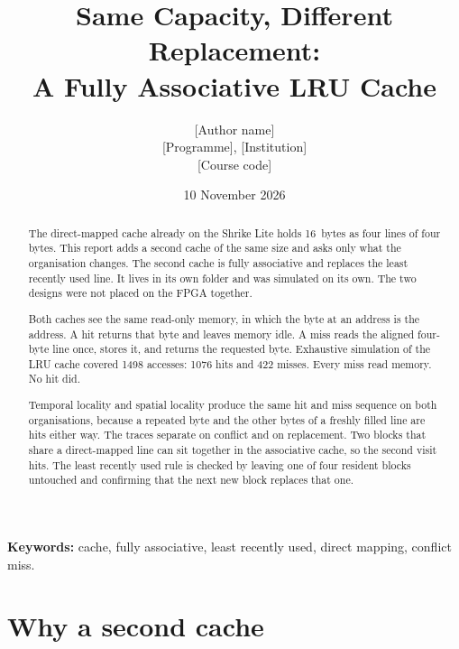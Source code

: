 \documentclass[a4paper,11pt,oneside,headings=small,parskip=half,titlepage=false]{scrreprt}
\begin{document}
\titlehead{Computer architecture project report}
\subject{Fully associative LRU, compared with the direct-mapped cache}
\title{Same Capacity, Different Replacement:\\A Fully Associative LRU Cache}
\author{[Author name]\\[0.35em]
\normalsize [Programme], [Institution]\\
\normalsize [Course code]}
\date{10 November 2026}
\publishers{Simulation of the LRU cache. The direct-mapped cache is the board design.}
\maketitle

\begin{abstract}
\noindent
The direct-mapped cache already on the Shrike Lite holds 16~bytes as four lines of four bytes. This report adds a second cache of the same size and asks only what the organisation changes. The second cache is fully associative and replaces the least recently used line. It lives in its own folder and was simulated on its own. The two designs were not placed on the FPGA together.

Both caches see the same read-only memory, in which the byte at an address is the address. A hit returns that byte and leaves memory idle. A miss reads the aligned four-byte line once, stores it, and returns the requested byte. Exhaustive simulation of the LRU cache covered \num{1498} accesses: \num{1076} hits and \num{422} misses. Every miss read memory. No hit did.

Temporal locality and spatial locality produce the same hit and miss sequence on both organisations, because a repeated byte and the other bytes of a freshly filled line are hits either way. The traces separate on conflict and on replacement. Two blocks that share a direct-mapped line can sit together in the associative cache, so the second visit hits. The least recently used rule is checked by leaving one of four resident blocks untouched and confirming that the next new block replaces that one.
\end{abstract}

\noindent\textbf{Keywords:} cache, fully associative, least recently used, direct mapping, conflict miss.

\tableofcontents

\chapter{Why a second cache}
\label{ch:why}
\end{document}
